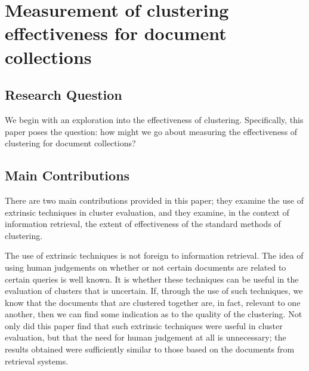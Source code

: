 \documentclass[sigconf,authorversion,nonacm]{acmart}
\begin{document}
\section{Measurement of clustering effectiveness for document collections}
\subsection{Research Question}
We begin with an exploration into the effectiveness of clustering. Specifically, this paper poses the question: how might we go about measuring the effectiveness of clustering for document collections?
\subsection{Main Contributions}
There are two main contributions provided in this paper; they examine the use of extrinsic techniques in cluster evaluation, and they examine, in the context of information retrieval, the extent of effectiveness of the standard methods of clustering.

The use of extrinsic techniques is not foreign to information retrieval. The idea of using human judgements on whether or not certain documents are related to certain queries is well known. It is whether these techniques can be useful in the evaluation of clusters that is uncertain.
If, through the use of such techniques, we know that the documents that are clustered together are, in fact, relevant to one another, then we can find some indication as to the quality of the clustering.
Not only did this paper find that such extrinsic techniques were useful in cluster evaluation, but that the need for human judgement at all is unnecessary; the results obtained were sufficiently similar to those based on the documents from retrieval systems.
\end{document}
